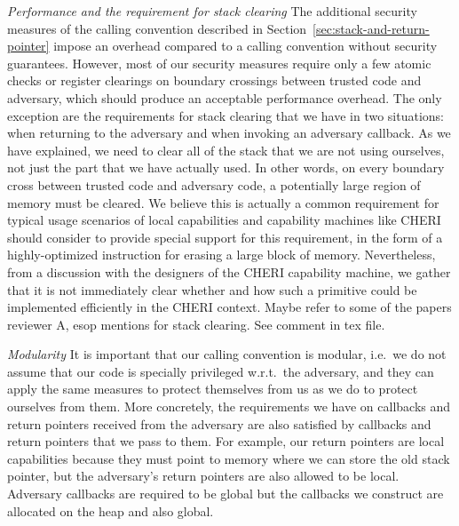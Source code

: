 \documentclass[format=acmsmall, review=false, screen=true]{acmart}
\renewcommand{\sectionname}{Section}
\newcommand{\itoplassug}[1]
    {{\color{Blue} #1}}
\begin{document}
\emph{Performance and the requirement for stack clearing} The additional
security measures of the calling convention described in
\sectionname~\ref{sec:stack-and-return-pointer} impose an overhead compared to a
calling convention without security guarantees. However, most of our security
measures require only a few atomic checks or register clearings on boundary
crossings between trusted code and adversary, which should produce an acceptable
performance overhead. The only exception are the requirements for stack clearing
that we have in two situations: when returning to the adversary and when
invoking an adversary callback. As we have explained, we need to clear all of
the stack that we are not using ourselves, not just the part that we have
actually used. In other words, on every boundary cross between trusted code and
adversary code, a potentially large region of memory must be cleared. We believe
this is actually a common requirement for typical usage scenarios of local
capabilities and capability machines like CHERI should consider to provide
special support for this requirement, in the form of a highly-optimized
instruction for erasing a large block of memory. Nevertheless, from a discussion
with the designers of the CHERI capability machine, we gather that it is not immediately
clear whether and how such a primitive could be implemented efficiently in the CHERI context.
\itoplassug{Maybe refer to some of the papers reviewer A, esop mentions for stack clearing. See comment in tex file. }


\emph{Modularity} It is important that our calling convention is modular, i.e.\
we do not assume that our code is specially privileged w.r.t.\ the adversary,
and they can apply the same measures to protect themselves from us as we do to
protect ourselves from them. More concretely, the requirements we have on
callbacks and return pointers received from the adversary are also satisfied by
callbacks and return pointers that we pass to them. For example, our return
pointers are local capabilities because they must point to memory where we can
store the old stack pointer, but the adversary's return pointers are also
allowed to be local. Adversary callbacks are required to be global but the
callbacks we construct are allocated on the heap and also global.
\end{document}
